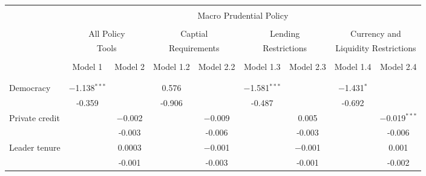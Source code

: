 \begin{landscape}																																		
\begin{table}[!htbp]	\centering																																	
	\caption{}																																	
	\label{}																																	
\begin{tabular}{@{\extracolsep{5pt}}lcccccccc}																																		
\\[-1.8ex]\hline																																		
\hline	\\[-1.8ex]																																	
	&	\multicolumn{8}{c}{Macro Prudential Policy}			\\																													
\cline{2-9}																																		
\\[-1.8ex]																																		
	&	\multicolumn{2}{c}{All Policy} &				\multicolumn{2}{c}{Captial} &				\multicolumn{2}{c}{Lending} &				\multicolumn{2}{c}{Currency and}			\\																	
	&	\multicolumn{2}{c}{Tools} &				\multicolumn{2}{c}{Requirements} &				\multicolumn{2}{c}{Restrictions} &				\multicolumn{2}{c}{Liquidity Restrictions}			\\																	
\cline{2-3}	\cline{4-5}	\cline{6-7}	\cline{8-9}																															
\\[-1.8ex]	&	Model 1	&	Model 2	&	Model 1.2	&	Model 2.2	&	Model 1.3	&	Model 2.3	&	Model 1.4	&	Model 2.4	\\																	
\hline	\\[-1.8ex]		&		&		&		&		&		&		&		\\																	
Democracy	&	$-$1.138$^{***}$	&		&	0.576	&		&	$-$1.581$^{***}$	&		&	$-$1.431$^{*}$	&	&	\\																	
	&	-0.359	&		&	-0.906	&		&	-0.487	&		&	-0.692	&	&	\\																	
																																		
Private credit	&		&	$-$0.002	&		&	$-$0.009	&		&	0.005	&		&	$-$0.019$^{***}$	\\																	
	&		&	-0.003	&		&	-0.006	&		&	-0.003	&		&	-0.006	\\																	
																																		
Leader tenure	&		&	0.0003	&		&	$-$0.001	&		&	$-$0.001	&		&	0.001	\\																	
	&		&	-0.001	&		&	-0.003	&		&	-0.001	&		&	-0.002	\\																	
																																		

\end{tabular}
\end{table}
\end{landscape}
